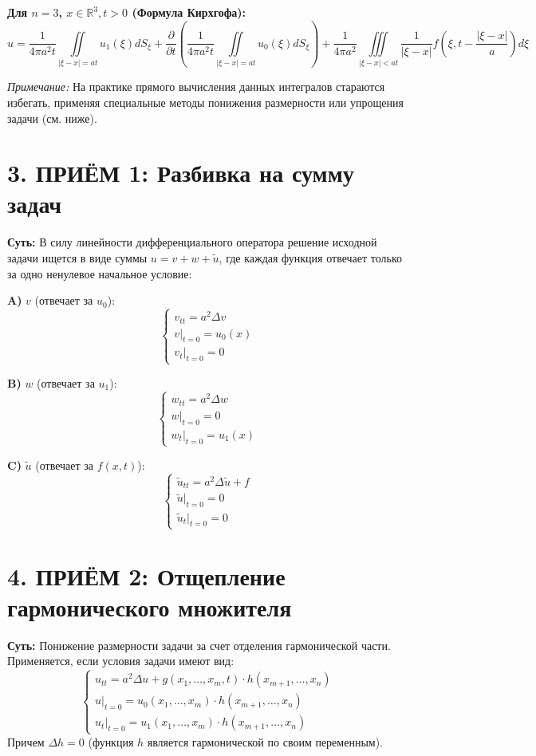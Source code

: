 \noindent\textbf{Для $n=3$, $x \in \mathbb{R}^3, t>0$ (Формула Кирхгофа):}
\[ u = \frac{1}{4\pi a^2 t} \iint\limits_{|\xi-x|=at} u_1(\xi)dS_\xi + \frac{\partial}{\partial t}\left( \frac{1}{4\pi a^2 t} \iint\limits_{|\xi-x|=at} u_0(\xi)dS_\xi \right) + \frac{1}{4\pi a^2}\iiint\limits_{|\xi-x|<at} \frac{1}{|\xi-x|} f\left(\xi, t - \frac{|\xi-x|}{a}\right) d\xi \]

\textit{Примечание:} На практике прямого вычисления данных интегралов стараются избегать, применяя специальные методы понижения размерности или упрощения задачи (см. ниже).

\section{3. ПРИЁМ 1: Разбивка на сумму задач}
\textbf{Суть:} В силу линейности дифференциального оператора решение исходной задачи ищется в виде суммы $u = v + w + \tilde{u}$, где каждая функция отвечает только за одно ненулевое начальное условие:

\vspace{0.2cm}
\noindent
\begin{minipage}{0.32\textwidth}
\textbf{A)} $v$ (отвечает за $u_0$): 
\[ \begin{cases} v_{tt} = a^2\Delta v \\ v|_{t=0} = u_0(x) \\ v_t|_{t=0} = 0 \end{cases} \]
\end{minipage}
\hfill
\begin{minipage}{0.32\textwidth}
\textbf{B)} $w$ (отвечает за $u_1$): 
\[ \begin{cases} w_{tt} = a^2\Delta w \\ w|_{t=0} = 0 \\ w_t|_{t=0} = u_1(x) \end{cases} \]
\end{minipage}
\hfill
\begin{minipage}{0.32\textwidth}
\textbf{C)} $\tilde{u}$ (отвечает за $f(x,t)$): 
\[ \begin{cases} \tilde{u}_{tt} = a^2\Delta \tilde{u} + f \\ \tilde{u}|_{t=0} = 0 \\ \tilde{u}_t|_{t=0} = 0 \end{cases} \]
\end{minipage}

\section{4. ПРИЁМ 2: Отщепление гармонического множителя}
\textbf{Суть:} Понижение размерности задачи за счет отделения гармонической части. Применяется, если условия задачи имеют вид: 
\[
\begin{cases} 
u_{tt} = a^2 \Delta u + g(x_1, \dots, x_m, t) \cdot h(x_{m+1}, \dots, x_n) \\ 
u|_{t=0} = u_0(x_1, \dots, x_m) \cdot h(x_{m+1}, \dots, x_n) \\ 
u_t|_{t=0} = u_1(x_1, \dots, x_m) \cdot h(x_{m+1}, \dots, x_n) 
\end{cases}
\]
Причем $\Delta h = 0$ (функция $h$ является гармонической по своим переменным).

